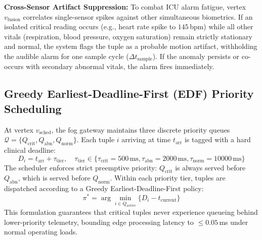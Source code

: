 \documentclass[conference]{IEEEtran}
\begin{document}
\textbf{Cross-Sensor Artifact Suppression:} To combat ICU alarm fatigue, vertex $v_{\text{fusion}}$ correlates single-sensor spikes against other simultaneous biometrics. If an isolated critical reading occurs (e.g., heart rate spike to $145$\,bpm) while all other vitals (respiration, blood pressure, oxygen saturation) remain strictly stationary and normal, the system flags the tuple as a probable motion artifact, withholding the audible alarm for one sample cycle ($\Delta t_{\text{sample}}$). If the anomaly persists or co-occurs with secondary abnormal vitals, the alarm fires immediately.

\subsection{Greedy Earliest-Deadline-First (EDF) Priority Scheduling}
At vertex $v_{\text{sched}}$, the fog gateway maintains three discrete priority queues $\mathcal{Q} = \{Q_{\text{crit}}, Q_{\text{abn}}, Q_{\text{norm}}\}$. Each tuple $i$ arriving at time $t_{\text{arr}}$ is tagged with a hard clinical deadline:
\begin{equation}
D_i = t_{\text{arr}} + \tau_{\text{tier}}, \quad \tau_{\text{tier}} \in \{\tau_{\text{crit}}=500\,\text{ms}, \tau_{\text{abn}}=2000\,\text{ms}, \tau_{\text{norm}}=10000\,\text{ms}\}
\end{equation}
The scheduler enforces strict preemptive priority: $Q_{\text{crit}}$ is always served before $Q_{\text{abn}}$, which is served before $Q_{\text{norm}}$. Within each priority tier, tuples are dispatched according to a Greedy Earliest-Deadline-First policy:
\begin{equation}
\pi^* = \arg\min_{i \in Q_{\text{active}}} \{ D_i - t_{\text{current}} \}
\end{equation}
This formulation guarantees that critical tuples never experience queueing behind lower-priority telemetry, bounding edge processing latency to $\le 0.05$\,ms under normal operating loads.
\end{document}

